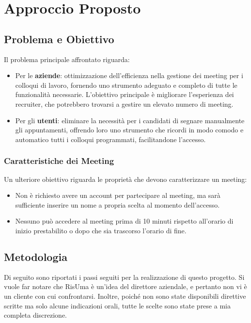 \chapter{Approccio Proposto}
\section{Problema e Obiettivo}
Il problema principale affrontato riguarda:

\begin{itemize}
   \item Per le \textbf{aziende}: ottimizzazione dell'efficienza nella gestione dei meeting per i colloqui di lavoro, 
   fornendo uno strumento adeguato e completo di tutte le funzionalità necessarie. 
   L'obiettivo principale è migliorare l'esperienza dei recruiter, che potrebbero trovarsi a gestire un elevato numero di meeting.

    \item Per gli \textbf{utenti}: eliminare la necessità per i candidati di segnare manualmente gli appuntamenti, 
    offrendo loro uno strumento che ricordi in modo comodo e automatico tutti i colloqui programmati, facilitandone l'accesso.
 \end{itemize}

   \subsection{Caratteristiche dei Meeting}
   \label{sec:caratteristiche_meeting}
   Un ulteriore obiettivo riguarda le proprietà che devono caratterizzare un meeting:

      \begin{itemize}
         \item Non è richiesto avere un account per partecipare al meeting, ma sarà sufficiente inserire un nome a propria scelta al momento dell'accesso.
         
         \item Nessuno può accedere al meeting prima di 10 minuti rispetto all'orario di inizio prestabilito o dopo che sia trascorso l'orario di fine.
      \end{itemize}

\section{Metodologia}
Di seguito sono riportati i passi seguiti per la realizzazione di questo progetto.
Si vuole far notare che RisUma è un'idea del direttore aziendale, 
e pertanto non vi è un cliente con cui confrontarsi. Inoltre, poiché non sono state disponibili direttive scritte ma solo 
alcune indicazioni orali, tutte le scelte sono state prese a mia completa discrezione.


